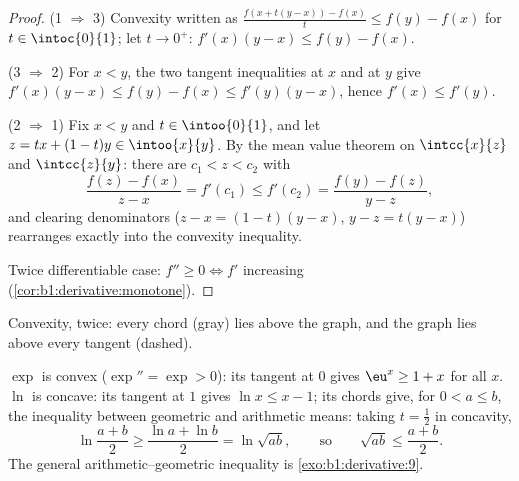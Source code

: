 \begin{proof}
(1 $\Rightarrow$ 3) Convexity written as $\frac{f(x + t(y-x)) -
f(x)}{t} \leq f(y) - f(x)$ for $t \in \intoc{0}{1}$; let $t \to 0^+$:
$f'(x)(y - x) \leq f(y) - f(x)$.

(3 $\Rightarrow$ 2) For $x < y$, the two tangent inequalities at $x$
and at $y$ give $f'(x)(y-x) \leq f(y) - f(x) \leq f'(y)(y - x)$,
hence $f'(x) \leq f'(y)$.

(2 $\Rightarrow$ 1) Fix $x < y$ and $t \in \intoo{0}{1}$, and let $z
= tx + (1-t)y \in \intoo{x}{y}$. By the mean value theorem on
$\intcc{x}{z}$ and $\intcc{z}{y}$: there are $c_1 < z < c_2$ with
\[
\frac{f(z) - f(x)}{z - x} = f'(c_1) \leq f'(c_2)
= \frac{f(y) - f(z)}{y - z} ,
\]
and clearing denominators ($z - x = (1-t)(y-x)$, $y - z = t(y-x)$)
rearranges exactly into the convexity inequality.

Twice differentiable case: $f'' \geq 0 \iff f'$ increasing
(\cref{cor:b1:derivative:monotone}).
\end{proof}

\begin{omfigure}

{\small Convexity, twice: every chord (gray) lies above the graph,
and the graph lies above every tangent (dashed).}
\end{omfigure}

\begin{example}\label{ex:b1:derivative:convexineq}
$\exp$ is convex ($\exp'' = \exp > 0$): its tangent at $0$ gives
$\eu^x \geq 1 + x$ for all $x$. $\ln$ is concave: its tangent at $1$
gives $\ln x \leq x - 1$; its chords give, for $0 < a \leq b$, the
inequality between geometric and arithmetic means: taking $t =
\frac12$ in concavity,
\[
\ln\frac{a + b}{2} \geq \frac{\ln a + \ln b}{2} = \ln\sqrt{ab},
\qquad\text{so}\qquad
\sqrt{ab} \leq \frac{a+b}{2} .
\]
The general arithmetic--geometric inequality is
\cref{exo:b1:derivative:9}.
\end{example}

